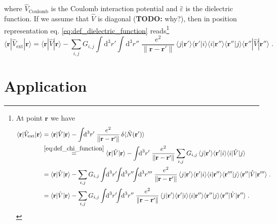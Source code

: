 \documentclass[a4paper,12pt]{article}
\begin{document}
    where $\hat V_\text{Coulomb}$ is the Coulomb interaction potential and $\hat\varepsilon$ is the dielectric function. If we assume that $\hat V$ is diagonal (\textbf{TODO:} why?), then in position representation eq. \eqref{eq:def_dielectric_function} reads\footnote{ %
At point $\mathbf{r}$ we have
    \begin{equation*}
    \begin{aligned}
        \langle \mathbf{r}|\hat V_\text{ext} | \mathbf{r} \rangle 
            &= \langle \mathbf{r} | \hat V | \mathbf{r} \rangle - \int \!\! \text{d}^3 r' \;  \frac{e^2}{\| \mathbf{r} - \mathbf{r'} \|}\, \delta \langle \hat N(\mathbf{r'}) \rangle \\
            &\overset{\eqref{eq:def_chi_function}}{=} \langle \mathbf{r} | \hat V | \mathbf{r} \rangle - \int\!\! \text{d}^3 r' \; \frac{e^2}{\| \mathbf{r} - \mathbf{r'} \|} \sum_{i,j} G_{i,j} \, \langle j |\mathbf{r'}\rangle\langle\mathbf{r'} | i \rangle\langle i | \hat V | j \rangle \\
            &= \langle \mathbf{r} | \hat V | \mathbf{r} \rangle - \sum_{i,j} G_{i,j} \int\!\! \text{d}^3 r' \!\! \int\!\! \text{d}^3 r'' \!\! \int\!\! \text{d}^3 r''' \; \frac{e^2}{\| \mathbf{r} - \mathbf{r'} \|} \, \langle j |\mathbf{r'}\rangle\langle\mathbf{r'} | i \rangle \langle i | \mathbf{r''}\rangle \langle \mathbf{r'''} | j \rangle \langle \mathbf{r''} | \hat V | \mathbf{r'''} \rangle\; . \\
            &= \langle \mathbf{r} | \hat V | \mathbf{r} \rangle - \sum_{i,j} G_{i,j} \int\!\! \text{d}^3 r' \!\! \int\!\! \text{d}^3 r'' \; \frac{e^2}{\| \mathbf{r} - \mathbf{r'} \|} \, \langle j |\mathbf{r'}\rangle\langle\mathbf{r'} | i \rangle \langle i | \mathbf{r''}\rangle \langle \mathbf{r''} | j \rangle \langle \mathbf{r''} | \hat V | \mathbf{r''} \rangle\; .
    \end{aligned}
    \end{equation*}
} %
    \begin{equation*}
        \langle \mathbf{r}|\hat V_\text{ext} | \mathbf{r} \rangle 
            = \langle \mathbf{r} | \hat V | \mathbf{r} \rangle - \sum_{i,j} G_{i,j} \int\!\! \text{d}^3 r' \!\! \int\!\! \text{d}^3 r'' \; \frac{e^2}{\| \mathbf{r} - \mathbf{r'} \|} \, \langle j |\mathbf{r'}\rangle\langle\mathbf{r'} | i \rangle \langle i | \mathbf{r''}\rangle \langle \mathbf{r''} | j \rangle \langle \mathbf{r''} | \hat V | \mathbf{r''} \rangle\; .
    \end{equation*}


\section{Application}
\end{document}
